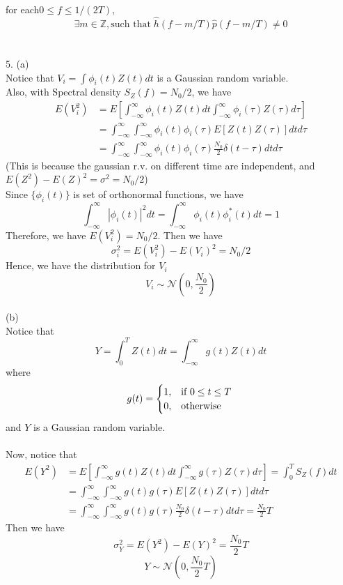 \documentclass [12pt] {article}
\begin{document}
\begin{spacing}{1.5}
for each$ 0 \leq f \leq 1/(2T)$, $$\exists m \in \mathbb{Z}, \text{such that} \; \hat{h}(f-m/T)\hat{p}(f-m/T) \neq 0$$
~\\
\pagebreak
~\\
5. (a)\\
Notice that  $V_i = \int \phi_i(t)Z(t)dt$ is a Gaussian random variable.\\
Also, with Spectral density $S_Z(f)= N_0/2$, we have 
\begin{align*}
E(V_i ^2) &= E[\int_{-\infty}^{\infty}\phi_i(t) Z(t) dt \int_{-\infty}^{\infty}\phi_i(\tau) Z(\tau) d\tau]\\
& = \int_{-\infty}^{\infty} \int_{-\infty}^{\infty} \phi_i(t)\phi_i(\tau) E[Z(t) Z(\tau)] dt d\tau\\
& = \int_{-\infty}^{\infty} \int_{-\infty}^{\infty} \phi_i(t)\phi_i(\tau) \frac{N_0}{2}\delta(t-\tau) dt d\tau
\end{align*}
(This is because the gaussian r.v. on different time are independent, and $E(Z^2)-E(Z)^2 = \sigma ^2 = N_0/2$)\\
Since $\{\phi_i(t)\}$ is set of orthonormal functions, we have 
$$ \int_{-\infty}^{\infty}|\phi_i(t)|^2 dt = \int_{-\infty}^{\infty}\phi_i(t) \phi_i^*(t) dt = 1$$
Therefore, we have $E(V_i^2) = N_0/2$.
Then we have $$\sigma_i^2 = E(V_i^2) - E(V_i)^2 = N_0/2 $$
Hence, we have the distribution for $V_i$
$$ V_i\sim \mathcal{N}(0, \frac{N_0}{2})$$
~\\
(b)\\
Notice that  
$$Y= \int_0^T Z(t)dt = \int_{-\infty}^{\infty} g(t)Z(t)dt $$
where
$$
g(t) = \begin{cases}
    1, & \text{if } 0 \leq t \leq T\\
    0,  & \text{otherwise}
\end{cases}\\
$$
and $Y$ is a Gaussian random variable.\\
~\\
Now, notice that
\begin{align*}
 E(Y ^2) &= E[\int_{-\infty}^{\infty}g(t) Z(t) dt \int_{-\infty}^{\infty}g(\tau) Z(\tau) d\tau] = \int_0^T S_Z(f) dt \\
 & = \int_{-\infty}^{\infty} \int_{-\infty}^{\infty} g(t)g(\tau) E[Z(t) Z(\tau)] dt d\tau\\
& = \int_{-\infty}^{\infty} \int_{-\infty}^{\infty} g(t)g(\tau) \frac{N_0}{2}\delta(t-\tau) dt d\tau = \frac{N_0}{2}T
 \end{align*}
Then we have
$$\sigma_Y^2 = E(Y^2) - E(Y)^2 = \frac{N_0}{2}T $$
$$ Y\sim \mathcal{N}(0, \frac{N_0}{2}T)$$
~\\

\end{spacing}
\end{document}
